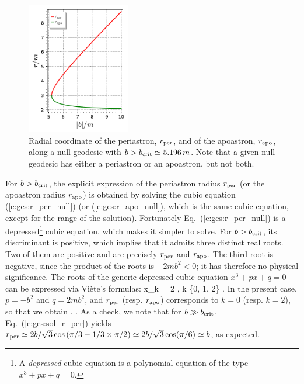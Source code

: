 \begin{figure}
\centerline{\includegraphics[width=0.4\textwidth]{ges_null_per_apo.pdf}}
\caption[]{\label{f:gis:null_per_apo} \footnotesize
Radial coordinate of the periastron, $r_{\rm per}$, and of the apoastron,
$r_{\rm apo}$, along a null geodesic with $b > b_{\rm crit} \simeq 5.196\, m$.
Note that a given null geodesic has either a periastron or an apoastron, but not
both.}
\end{figure}


For $b > b_{\rm crit}$, the explicit expression of the periastron radius
$r_{\rm per}$ (or the apoastron radius $r_{\rm apo}$)
is obtained by solving the cubic equation (\ref{e:ges:r_per_null})
(or (\ref{e:ges:r_apo_null}), which is the same cubic equation, except for
the range of the solution). Fortunately Eq.~(\ref{e:ges:r_per_null})
is a depressed\footnote{A \emph{depressed} cubic equation is a polynomial equation
of the type $x^3 + p x + q = 0$.} cubic equation, which makes
it simpler to solve. For $b > b_{\rm crit}$, its discriminant is positive, which
implies that it admits three distinct real roots. Two of them are positive
and are precisely $r_{\rm per}$ and $r_{\rm apo}$. The third root is negative,
since the product of the roots is $-2mb^2 < 0$; it has therefore no
physical significance. The roots of the generic depressed cubic
equation $x^3 + p x + q = 0$ can be expressed via Viète's formulas:
\be
    x_k = 2  \cos {},
        \qquad k \in \{0, 1, 2\} .
\ee
In the present case, $p= - b^2$ and $q = 2 m b^2$,
and $r_{\rm per}$ (resp. $r_{\rm apo}$) corresponds to $k=0$
(resp. $k=2$), so that we obtain
\be \label{e:ges:sol_r_per}
  .
\ee
\be \label{e:ges:sol_r_apo}
   .
\ee
As a check, we note that for $b\gg b_{\rm crit}$, Eq.~(\ref{e:ges:sol_r_per})
yields $r_{\rm per} \simeq 2b/\sqrt{3} \cos\left(\pi/3 -1/3 \times \pi/2 \right)
\simeq 2b/\sqrt{3} \cos(\pi/6) \simeq b$, as expected.

